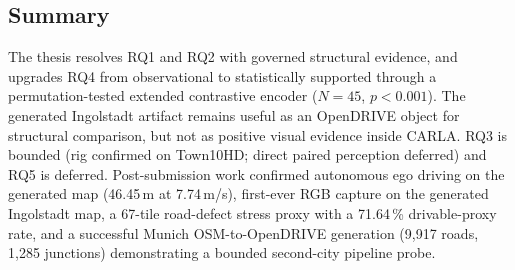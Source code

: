 \subsection{Summary}
The thesis resolves RQ1 and RQ2 with governed structural evidence, and upgrades RQ4 from observational to statistically supported through a permutation-tested extended contrastive encoder ($N=45$, $p<0.001$). The generated Ingolstadt artifact remains useful as an OpenDRIVE object for structural comparison, but not as positive visual evidence inside CARLA. RQ3 is bounded (rig confirmed on Town10HD; direct paired perception deferred) and RQ5 is deferred. Post-submission work confirmed autonomous ego driving on the generated map (46.45\,m at 7.74\,m/s), first-ever RGB capture on the generated Ingolstadt map, a 67-tile road-defect stress proxy with a 71.64\,\% drivable-proxy rate, and a successful Munich OSM-to-OpenDRIVE generation (9,917 roads, 1,285 junctions) demonstrating a bounded second-city pipeline probe.
